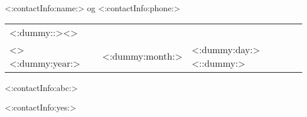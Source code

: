 \documentclass[10pt,a4paper]{article}
\begin{document}
	<:contactInfo:name:> og <:contactInfo:phone:>

	\begin{tabular}{lll}<:dummy::><>\\<>
		<:dummy:year:> & <:dummy:month:> & <:dummy:day:><::dummy:>
	\end{tabular}


	<:contactInfo:abc:>
	
	
	<:contactInfo:yes:>
\end{document}
